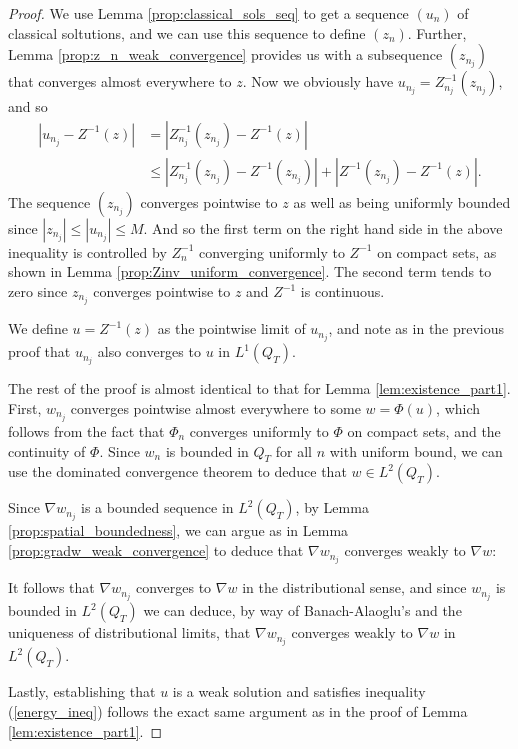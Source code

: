 \documentclass[11pt, a4paper]{article}
\begin{document}
\begin{proof}
We use Lemma \ref{prop:classical_sols_seq} to get a sequence $(u_n)$ of classical soltutions, and we can use this sequence to define $(z_n)$. Further, Lemma \ref{prop:z_n_weak_convergence} provides us with a subsequence $(z_{n_j})$ that converges almost everywhere to $z$.
Now we obviously have $u_{n_j} = Z_{n_j}^{-1}(z_{n_j})$, and so
\begin{align*}
|u_{n_j} - Z^{-1}(z)| &= |Z_{n_j}^{-1}(z_{n_j}) - Z^{-1}(z)| \\
&\leq |Z_{n_j}^{-1}(z_{n_j}) - Z^{-1}(z_{n_j})| + |Z^{-1}(z_{n_j})- Z^{-1}(z)|.
\end{align*}
The sequence $(z_{n_j})$ converges pointwise to $z$ as well as being uniformly bounded 
since $|z_{n_j}| \leq |u_{n_j}| \leq M$. And so the first term on the right hand side in the above inequality is controlled by $Z_n^{-1}$ converging uniformly to $Z^{-1}$ on compact sets, as shown in Lemma \ref{prop:Zinv_uniform_convergence}. The second term tends to zero since $z_{n_j}$ converges pointwise to $z$ and $Z^{-1}$ is continuous.

We define $u=Z^{-1}(z)$ as the pointwise limit of $u_{n_j}$, and note as in the previous proof that $u_{n_j}$ also converges to $u$ in $L^1(Q_T)$.

The rest of the proof is almost identical to that for Lemma \ref{lem:existence_part1}. First, $w_{n_j}$ converges pointwise almost everywhere to some $w = \Phi(u)$, which follows from the fact that $\Phi_n$ converges uniformly to $\Phi$ on compact sets, and the continuity of $\Phi$. Since $w_{n}$ is bounded in $Q_T$ for all $n$ with uniform bound, we can use the dominated convergence theorem to deduce that  $w \in L^2(Q_T)$.

Since $\nabla w_{n_j}$ is a bounded sequence in $L^2(Q_T)$, by Lemma \ref{prop:spatial_boundedness}, we can argue as in Lemma \ref{prop:gradw_weak_convergence} to deduce that $\nabla w_{n_j}$ converges weakly to $\nabla w$:

It follows that $\nabla w_{n_j}$ converges to $\nabla w$ in the distributional sense, and since $w_{n_j}$ is bounded in $L^2(Q_T)$ we can deduce, by way of Banach-Alaoglu's and the uniqueness of distributional limits, that $\nabla w_{n_j}$ converges weakly to $\nabla w$ in $L^2(Q_T)$.


Lastly, establishing that $u$ is a weak solution and satisfies inequality (\ref{energy_ineq}) follows the exact same argument as in the proof of Lemma \ref{lem:existence_part1}.
\end{proof}
\end{document}
